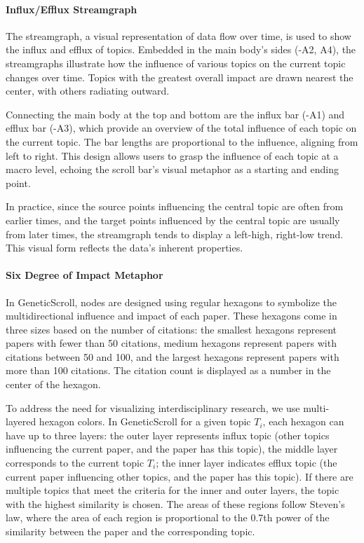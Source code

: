 \paragraph{Influx/Efflux Streamgraph}
The streamgraph, a visual representation of data flow over time, is used to show the influx and efflux of topics. Embedded in the main body’s sides (-A2, A4), the streamgraphs illustrate how the influence of various topics on the current topic changes over time. Topics with the greatest overall impact are drawn nearest the center, with others radiating outward.

Connecting the main body at the top and bottom are the influx bar (-A1) and efflux bar (-A3), which provide an overview of the total influence of each topic on the current topic. The bar lengths are proportional to the influence, aligning from left to right. This design allows users to grasp the influence of each topic at a macro level, echoing the scroll bar's visual metaphor as a starting and ending point.

In practice, since the source points influencing the central topic are often from earlier times, and the target points influenced by the central topic are usually from later times, the streamgraph tends to display a left-high, right-low trend. This visual form reflects the data's inherent properties.

\paragraph{Six Degree of Impact Metaphor} In GeneticScroll, nodes are designed using regular hexagons to symbolize the multidirectional influence and impact of each paper. These hexagons come in three sizes based on the number of citations: the smallest hexagons represent papers with fewer than 50 citations, medium hexagons represent papers with citations between 50 and 100, and the largest hexagons represent papers with more than 100 citations. The citation count is displayed as a number in the center of the hexagon.

To address the need for visualizing interdisciplinary research, we use multi-layered hexagon colors. In GeneticScroll for a given topic \( T_i \), each hexagon can have up to three layers: the outer layer represents influx topic (other topics influencing the current paper, and the paper has this topic), the middle layer corresponds to the current topic \( T_i \); the inner layer indicates efflux topic (the current paper influencing other topics, and the paper has this topic). If there are multiple topics that meet the criteria for the inner and outer layers, the topic with the highest similarity is chosen. The areas of these regions follow Steven's law, where the area of each region is proportional to the 0.7th power of the similarity between the paper and the corresponding topic.

